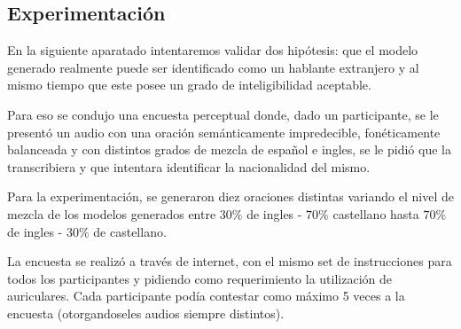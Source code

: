 \subsection{Experimentación}

En la siguiente aparatado intentaremos validar dos hipótesis: que el modelo generado realmente puede ser identificado como un hablante extranjero y al mismo tiempo que este posee un grado de inteligibilidad aceptable.

Para eso se condujo una encuesta perceptual donde, dado un participante, se le presentó un audio con una oración semánticamente impredecible, fonéticamente balanceada y con distintos grados de mezcla de español e ingles, se le pidió que la transcribiera y que intentara identificar la nacionalidad del mismo.

Para la experimentación, se generaron diez oraciones distintas variando el nivel de mezcla de los modelos generados entre $30\%$ de ingles - $70\%$ castellano hasta $70\%$ de ingles - $30\%$ de castellano.

La encuesta se realizó a través de internet, con el mismo set de instrucciones para todos los participantes y pidiendo como requerimiento la utilización de auriculares. Cada participante podía contestar como máximo 5 veces a la encuesta (otorgandoseles audios siempre distintos).
